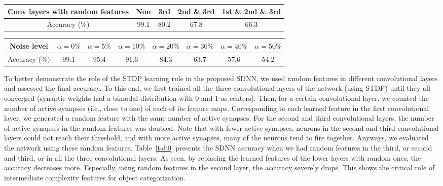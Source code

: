 \documentclass[preprint,5p,12pt,twocolumn]{article}
\begin{document}
\begin{table*}[!htb]
\centering
\caption{Recognition accuracies of the proposed SDNN with random features in different convolutional layers.}
\label{tab0}
\begin{tabular}{|c|c|c|c|c|}
\hline
Conv layers with random features &  Non& 3rd& 2nd \& 3rd & 1st \& 2nd \& 3rd\\ \hline
Accuracy (\%) &99.1&80.2&67.8&66.3\\
\hline
\end{tabular}
\end{table*}


\begin{table*}[!htb]
\centering
\caption{Recognition accuracies of the proposed SDNN for differen amounts of noise.}
\label{tab00}
\begin{tabular}{|c|c|c|c|c|c|c|c|}
\hline
Noise level &  $\alpha=0\%$&  $\alpha=5\%$ & $\alpha=10\%$& $\alpha=20\%$ & $\alpha=30\%$& $\alpha=40\%$ & $\alpha=50\%$\\ \hline
Accuracy (\%) &99.1&95.4&91.6&84.3&63.7&57.6&54.2\\
\hline
\end{tabular}
\end{table*}

To better demonstrate the role of the STDP learning rule in the proposed SDNN, we used random features in different convolutional layers and assessed the final accuracy. To this end, we first trained all the three convolutional layers of the network (using STDP) until they all converged (synaptic weights had a bimodal distribution with 0 and 1 as centers). Then, for a certain convolutional layer, we counted the number of active synapses (i.e., close to one) of each of its feature maps. Corresponding to each learned feature in the first convolutional layer, we generated a random feature with the same number of active synapses. For the second and third convolutional layers, the number of active synapses in the random features was doubled. Note that with fewer active synapses, neurons in the second and third convolutional layers could not reach their threshold, and with more active synapses, many of the neurons tend to fire together. Anyways, we evaluated the network using these random features. Table~\ref{tab0} presents the SDNN accuracy when we had random features in the third, or second and third, or in all the three convolutional layers. As seen, by replacing the learned features of the lower layers with random ones, the accuracy decreases more. Especially,  using random features in the second layer, the accuracy severely drops. This shows the critical role of intermediate complexity features for object categorization.
\end{document}
